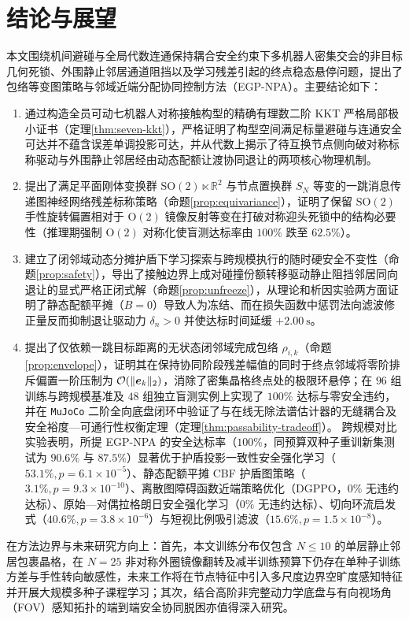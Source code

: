 \section{结论与展望}\label{sec:conclusion}

本文围绕机间避碰与全局代数连通保持耦合安全约束下多机器人密集交会的非目标几何死锁、外围静止邻居通道阻挡以及学习残差引起的终点稳态悬停问题，提出了包络等变图策略与邻域近端分配协同控制方法（EGP-NPA）。主要结论如下：
\begin{enumerate}
 \item 通过构造全员可动七机器人对称接触构型的精确有理数二阶 KKT 严格局部极小证书（定理\ref{thm:seven-kkt}），严格证明了构型空间满足标量避碰与连通安全可达并不蕴含误差单调投影可达，并从代数上揭示了待互换节点侧向破对称标称驱动与外围静止邻居经由动态配额让渡协同退让的两项核心物理机制。
 \item 提出了满足平面刚体变换群 $\mathrm{SO}(2)\ltimes\mathbb R^2$ 与节点置换群 $S_N$ 等变的一跳消息传递图神经网络残差标称策略（命题\ref{prop:equivariance}），证明了保留 $\mathrm{SO}(2)$ 手性旋转偏置相对于 $\mathrm{O}(2)$ 镜像反射等变在打破对称迎头死锁中的结构必要性（推理期强制 $\mathrm{O}(2)$ 对称化使盲测达标率由 $100\%$ 跌至 $62.5\%$）。
 \item 建立了闭邻域动态分摊护盾下学习探索与跨规模执行的随时硬安全不变性（命题\ref{prop:safety}），导出了接触边界上成对碰撞份额转移驱动静止阻挡邻居同向退让的显式严格正闭式解（命题\ref{prop:unfreeze}），从理论和析因实验两方面证明了静态配额平摊（$B=0$）导致人为冻结、而在损失函数中惩罚法向滤波修正量反而抑制退让驱动力 $\delta_n>0$ 并使达标时间延缓 $+2.00\ \mathrm s$。
 \item 提出了仅依赖一跳目标距离的无状态闭邻域完成包络 $\rho_{i,k}$（命题\ref{prop:envelope}），证明其在保持协同阶段残差幅值的同时于终点邻域将零阶排斥偏置一阶压制为 $\mathcal O(\lVert\boldsymbol{e}_k\rVert_2)$，消除了密集晶格终点处的极限环悬停；在 $96$ 组训练与跨规模基准及 $48$ 组独立盲测实例上实现了 $100\%$ 达标与零安全违约，并在 \texttt{MuJoCo} 二阶全向底盘闭环中验证了与在线无除法谱估计器的无缝耦合及安全裕度—可通行性权衡定理（定理\ref{thm:passability-tradeoff}）。
 跨规模对比实验表明，所提 EGP-NPA 的安全达标率（$100\%$，同预算双种子重训新集测试为 $90.6\%$ 与 $87.5\%$）显著优于护盾投影一致性安全强化学习（$53.1\%,p=6.1\times 10^{-5}$）、静态配额平摊 CBF 护盾图策略（$3.1\%,p=9.3\times 10^{-10}$）、离散图障碍函数近端策略优化（DGPPO，$0\%$ 无违约达标）、原始—对偶拉格朗日安全强化学习（$0\%$ 无违约达标）、切向环流启发式（$40.6\%,p=3.8\times 10^{-6}$）与短视比例吸引滤波（$15.6\%,p=1.5\times 10^{-8}$）。
\end{enumerate}

在方法边界与未来研究方向上：首先，本文训练分布仅包含 $N\le 10$ 的单层静止邻居包裹晶格，在 $N=25$ 非对称外圈镜像翻转及减半训练预算下仍存在单种子训练方差与手性转向敏感性，未来工作将在节点特征中引入多尺度边界空旷度感知特征并开展大规模多种子课程学习；其次，结合高阶非完整动力学底盘与有向视场角（FOV）感知拓扑的端到端安全协同脱困亦值得深入研究。
